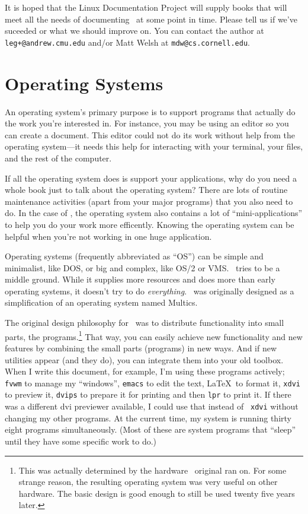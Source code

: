 It is hoped that the Linux Documentation Project will supply books
that will meet all the needs of documenting \linux\ at some point in
time.  Please tell us if we've suceeded or what we should improve on. You
can contact the author at {\tt leg+@andrew.cmu.edu} and/or Matt Welsh
at {\tt mdw@cs.cornell.edu}.

\section{Operating Systems}

An operating system's primary purpose is to
support programs that actually do the work you're interested in. For
instance, you may be using an editor so you can create a document. This
editor could not do its work without help from the operating system---it
needs this help for interacting with your terminal, your files, and the
rest of the computer.

If all the operating system does is support your applications, why do you
need a whole book just to talk about the operating system? There are lots
of routine maintenance activities (apart from your major programs) that you
also need to do.  In the case of \linux, the operating system also contains
a lot of ``mini-applications'' to help you do your work more efficently.
Knowing the operating system can be helpful when you're not working in one
huge application.

Operating systems (frequently abbreviated as ``OS'') can be simple and
minimalist, like DOS, or big and complex, like
OS/2 or VMS.  \unix\ tries to be a middle
ground.  While it supplies more resources and does more than early
operating systems, it doesn't try to do \emph{everything}.  \unix\ was
originally designed as a simplification of an operating system named
Multics.

The original design philosophy for \unix\ was to distribute
functionality into small parts, the programs.\footnote{This was
  actually determined by the hardware \unix\ original ran on. For some
  strange reason, the resulting operating system was very useful on
  other hardware.  The basic design is good enough to still be used
  twenty five years later.} That way, you can easily achieve new
functionality and new features by combining the small parts (programs)
in new ways. And if new utilities appear (and they do), you can
integrate them into your old toolbox.  When I write
this document, for example, I'm using these programs actively; {\tt
  fvwm} to manage my ``windows'', {\tt emacs} to edit the text,
\LaTeX\ to format it, {\tt xdvi} to preview it, {\tt dvips} to prepare
it for printing and then {\tt lpr} to print it. If there was a
different dvi previewer available, I could use that instead of {\tt
  xdvi} without changing my other programs.  At the current time, my
system is running thirty eight programs simultaneously.  (Most of
these are system programs that ``sleep'' until they have some specific
work to do.)

